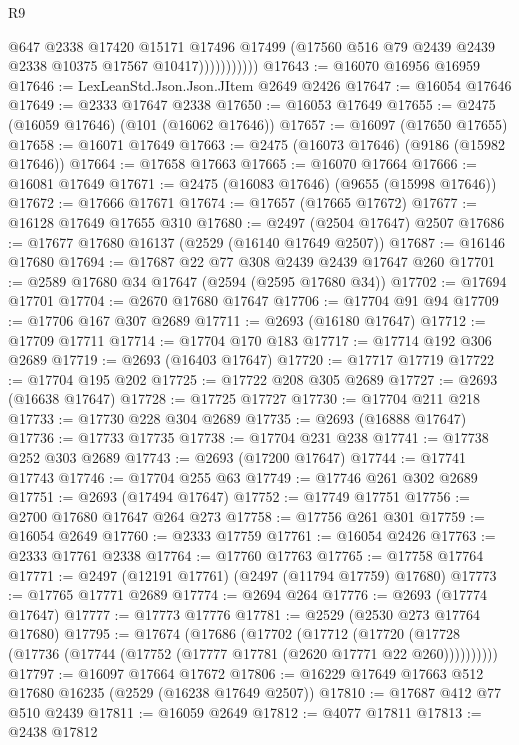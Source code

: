 \begin{lexlean}{R9}
\begin{coremodule}
                        @647
                        @2338
                        @17420
                        @15171
                        @17496
                        @17499
                        (@17560 @516 @79 @2439 @2439 @2338 @10375 @17567 @10417)))))))))))
@17643 := @16070 @16956 @16959
@17646 := LexLeanStd.Json.Json.JItem @2649 @2426
@17647 := @16054 @17646
@17649 := @2333 @17647 @2338
@17650 := @16053 @17649
@17655 := @2475 (@16059 @17646) (@101 (@16062 @17646))
@17657 := @16097 (@17650 @17655)
@17658 := @16071 @17649
@17663 := @2475 (@16073 @17646) (@9186 (@15982 @17646))
@17664 := @17658 @17663
@17665 := @16070 @17664
@17666 := @16081 @17649
@17671 := @2475 (@16083 @17646) (@9655 (@15998 @17646))
@17672 := @17666 @17671
@17674 := @17657 (@17665 @17672)
@17677 := @16128 @17649 @17655 @310
@17680 := @2497 (@2504 @17647) @2507
@17686 := @17677 @17680 @16137 (@2529 (@16140 @17649 @2507))
@17687 := @16146 @17680
@17694 := @17687 @22 @77 @308 @2439 @2439 @17647 @260
@17701 := @2589 @17680 @34 @17647 (@2594 (@2595 @17680 @34))
@17702 := @17694 @17701
@17704 := @2670 @17680 @17647
@17706 := @17704 @91 @94
@17709 := @17706 @167 @307 @2689
@17711 := @2693 (@16180 @17647)
@17712 := @17709 @17711
@17714 := @17704 @170 @183
@17717 := @17714 @192 @306 @2689
@17719 := @2693 (@16403 @17647)
@17720 := @17717 @17719
@17722 := @17704 @195 @202
@17725 := @17722 @208 @305 @2689
@17727 := @2693 (@16638 @17647)
@17728 := @17725 @17727
@17730 := @17704 @211 @218
@17733 := @17730 @228 @304 @2689
@17735 := @2693 (@16888 @17647)
@17736 := @17733 @17735
@17738 := @17704 @231 @238
@17741 := @17738 @252 @303 @2689
@17743 := @2693 (@17200 @17647)
@17744 := @17741 @17743
@17746 := @17704 @255 @63
@17749 := @17746 @261 @302 @2689
@17751 := @2693 (@17494 @17647)
@17752 := @17749 @17751
@17756 := @2700 @17680 @17647 @264 @273
@17758 := @17756 @261 @301
@17759 := @16054 @2649
@17760 := @2333 @17759
@17761 := @16054 @2426
@17763 := @2333 @17761 @2338
@17764 := @17760 @17763
@17765 := @17758 @17764
@17771 := @2497 (@12191 @17761) (@2497 (@11794 @17759) @17680)
@17773 := @17765 @17771 @2689
@17774 := @2694 @264
@17776 := @2693 (@17774 @17647)
@17777 := @17773 @17776
@17781 := @2529 (@2530 @273 @17764 @17680)
@17795 := @17674
    (@17686
      (@17702
        (@17712
          (@17720 (@17728 (@17736 (@17744 (@17752 (@17777 @17781 (@2620 @17771 @22 @260))))))))))
@17797 := @16097 @17664 @17672
@17806 := @16229 @17649 @17663 @512 @17680 @16235 (@2529 (@16238 @17649 @2507))
@17810 := @17687 @412 @77 @510 @2439
@17811 := @16059 @2649
@17812 := @4077 @17811
@17813 := @2438 @17812

\end{coremodule}
\end{lexlean}
